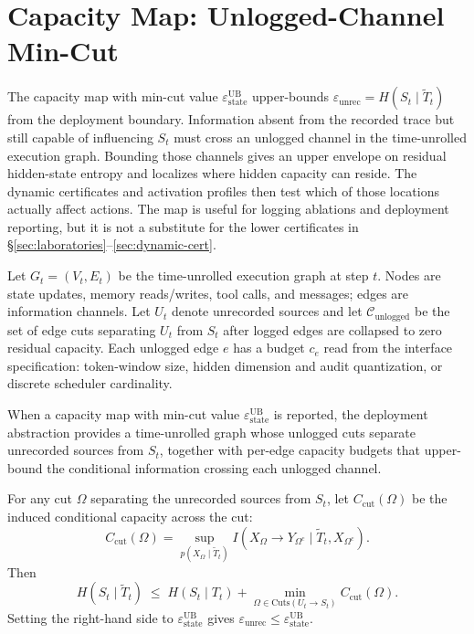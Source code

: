   \section{Capacity Map: Unlogged-Channel Min-Cut}
  \label{sec:static-cert}

  The capacity map with min-cut value $\varepsilon_\text{state}^\text{UB}$
  upper-bounds $\varepsilon_\text{unrec}=H(S_t\mid\tilde T_t)$ from the
  deployment boundary.
  Information absent from the recorded trace but still capable of influencing
  $S_t$ must cross an unlogged channel in the time-unrolled execution graph.
  Bounding those channels gives an upper envelope on residual hidden-state
  entropy and localizes where hidden capacity can reside. The dynamic
  certificates and activation profiles then test which of those locations
  actually affect actions. The map is useful for logging ablations and
  deployment reporting, but it is not a substitute for the lower certificates in
  \S\ref{sec:laboratories}--\ref{sec:dynamic-cert}.

  Let $G_t=(V_t,E_t)$ be the time-unrolled execution graph at step $t$.
  Nodes are state updates, memory reads/writes, tool calls, and messages; edges
  are information channels. Let $U_t$ denote unrecorded sources and let
  $\mathcal{C}_\text{unlogged}$ be the set of edge cuts separating $U_t$ from
  $S_t$ after logged edges are collapsed to zero residual capacity. Each
  unlogged edge $e$ has a budget $c_e$ read from the interface specification:
  token-window size, hidden dimension and audit quantization, or discrete
  scheduler cardinality.

  \begin{assumption}
  \label{assump:capacity-map-admissibility}
  When a capacity map with min-cut value
  $\varepsilon_\text{state}^\text{UB}$ is reported, the deployment abstraction
  provides a time-unrolled graph whose unlogged cuts separate unrecorded sources
  from $S_t$, together with per-edge capacity budgets that upper-bound the
  conditional information crossing each unlogged channel.
  \end{assumption}

  \begin{proposition}
  \label{prop:static-ub}
  For any cut $\Omega$ separating the unrecorded sources from $S_t$, let
  $C_\text{cut}(\Omega)$ be the induced conditional capacity across the cut:
  \[
    C_\text{cut}(\Omega)
    =
    \sup_{p(X_\Omega\mid\tilde T_t)}
    I(X_\Omega \to Y_{\Omega^c}\mid \tilde T_t,X_{\Omega^c}).
  \]
  Then
  \[
    H(S_t \mid \tilde T_t)
    \;\leq\;
    H(S_t\mid T_t)
    +
    \min_{\Omega\in\mathrm{Cuts}(U_t\to S_t)}
    C_\text{cut}(\Omega).
  \]
  Setting the right-hand side to
  $\varepsilon_\text{state}^\text{UB}$ gives
  $\varepsilon_\text{unrec}\leq \varepsilon_\text{state}^\text{UB}$.
  \end{proposition}

